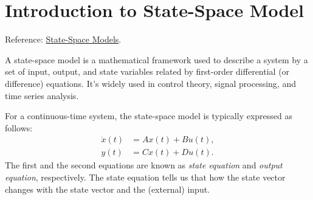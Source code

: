 \section{Introduction to State-Space Model}
\label{state:sec:ssm}
Reference: \href{http://apmonitor.com/pdc/index.php/Main/StateSpaceModel}{State-Space Models}.

A state-space model is a mathematical framework used to describe a system by a set of input, output, and state variables related by first-order differential (or difference) equations. It's widely used in control theory, signal processing, and time series analysis.


For a continuous-time system, the state-space model is typically expressed as follows:
\begin{align*}
	\dot{x}(t) &= {A}x(t)+{B}u(t),\\
	y(t) &= {C}x(t)+Du(t).
\end{align*}
The first and the second equations are known as \textit{state equation} and \textit{output equation}, respectively. The state equation tells us that how the state vector changes with the state vector and the (external) input. 

